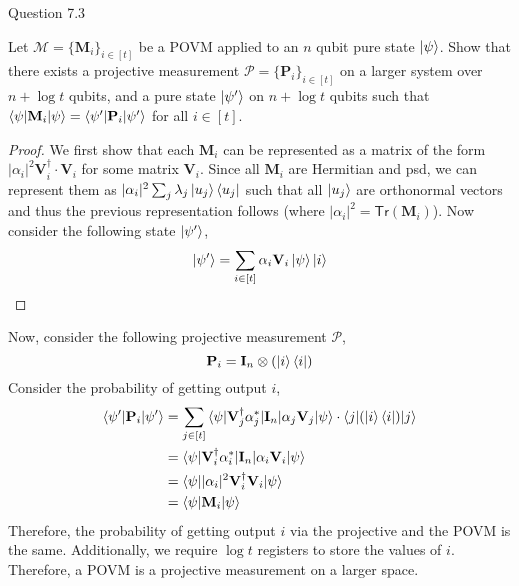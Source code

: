 \begin{solution}{Question 7.3}\label{ques:73}
    \begin{question}
        Let $\mathcal{M} = \{\mathbf{M}_i\}_{i\in[t]}$ be a POVM applied to an $n$ qubit pure state $\ket{\psi}$. Show that there exists a projective measurement $\mathcal{P} = \{\mathbf{P}_i\}_{i\in[t]}$ on a larger system over $n + \log t$ qubits, and a pure state $\ket{\psi'}$ on $n + \log t$ qubits such that $\braket{\psi|\mathbf{M}_i|\psi} = \braket{\psi'|\mathbf{P}_i|\psi'}$ for all $i\in[t]$.
    \end{question}
    \tcblower{}
    \begin{proof}
        We first show that each $\mathbf{M}_i$ can be represented as a matrix of the form $|\alpha_i|^2\mathbf{V}_i^\dagger\cdot\mathbf{V}_i$ for some matrix $\mathbf{V}_i$. Since all $\mathbf{M}_i$ are Hermitian and psd, we can represent them as $|\alpha_i|^2\sum_j\lambda_j\ket{u_j}\bra{u_j}$ such that all $\ket{u_j}$ are orthonormal vectors and thus the previous representation follows (where $|\alpha_i|^2 = \mathsf{Tr}(\mathbf{M}_i)$). Now consider the following state $\ket{\psi'}$,
        \begin{equation}
            \ket{\psi'} = \sum_{i\in[t]}\alpha_i\mathbf{V}_i\ket{\psi}\ket{i}
        \end{equation}
    \end{proof}
    Now, consider the following projective measurement $\mathcal{P}$,
    \begin{equation}
        \mathbf{P}_i = \mathbf{I}_n\otimes(\ket{i}\bra{i})
    \end{equation}
    Consider the probability of getting output $i$,
    \begin{equation}
        \begin{split}
            \braket{\psi'|\mathbf{P}_i|\psi'} &= \sum_{j\in[t]}\braket{\psi|\mathbf{V}_j^\dagger\alpha_j^*|\mathbf{I}_n|\alpha_j\mathbf{V}_j|\psi}\cdot\braket{j|(\ket{i}\bra{i})|j}\\
                                              &= \braket{\psi|\mathbf{V}_i^\dagger\alpha_i^*|\mathbf{I}_n|\alpha_i\mathbf{V}_i|\psi}\\
                                              &= \braket{\psi||\alpha_i|^2\mathbf{V}_i^\dagger\mathbf{V}_i|\psi}\\
                                              &= \braket{\psi|\mathbf{M}_i|\psi}
        \end{split}
    \end{equation}
    Therefore, the probability of getting output $i$ via the projective and the POVM is the same. Additionally, we require $\log t$ registers to store the values of $i$. Therefore, a POVM is a projective measurement on a larger space.
\end{solution}
